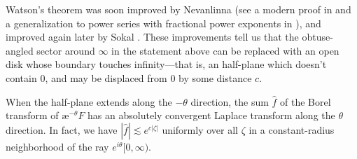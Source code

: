\documentclass{article}
\newcommand{\aexp}{\text{\ae}}
\theoremstyle{definition}
\theoremstyle{plain}
\begin{document}
Watson's theorem was soon improved by Nevanlinna \cite{nevanlinna} (see a modern proof in \cite[Theorem~B.15]{nikolaev2023exact} and a generalization to power series with fractional power exponents in \cite{delabaere--rosoamanana}), and improved again later by Sokal \cite{sokal1980improvement}. These improvements tell us that the obtuse-angled sector around $\infty$ in the statement above can be replaced with an open disk whose boundary touches infinity---that is, an half-plane which doesn't contain $0$, and may be displaced from $0$ by some distance $c$.
\begin{center}
\end{center}
When the half-plane extends along the $-\theta$ direction, the sum $\hat{f}$ of the Borel transform of $\aexp^{-\theta} F$ has an absolutely convergent Laplace transform along the $\theta$ direction. In fact, we have $|\hat{f}| \lesssim e^{c |\zeta|}$ uniformly over all $\zeta$ in a constant-radius neighborhood of the ray $e^{i\theta}[0, \infty)$. 
\end{document}

